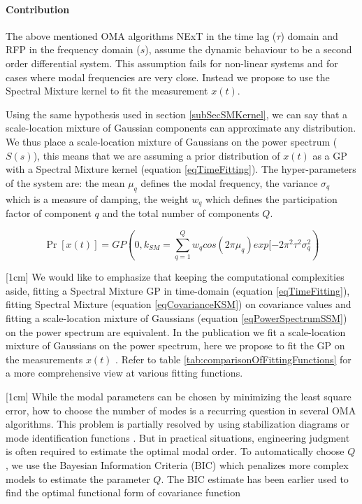 \begin{mdframed}[hidealllines=true,backgroundcolor=blue!20]
\paragraph{Contribution}
The above mentioned OMA algorithms NExT in the time lag ($ \tau$) domain and RFP in the frequency domain ($s$), assume the dynamic behaviour to be a second order differential system. This assumption fails for non-linear systems and for cases where modal frequencies are very close. Instead we propose to use the Spectral Mixture kernel to fit the measurement $x(t)$. 

Using the same hypothesis used in section \ref{subSecSMKernel}, we can say that a scale-location mixture of Gaussian components can approximate any distribution. We thus place a scale-location mixture of Gaussians on the power spectrum ($S(s)$), this means that we are assuming a prior distribution of $x(t)$ as a GP with a Spectral Mixture kernel (equation \ref{eqTimeFitting}). The hyper-parameters of the system are: the mean $\mu_{q}$ defines the modal frequency, the variance $\sigma_{q}$ which is a measure of damping, the weight $w_{q}$ which defines the participation factor of component $q$ and the total number of components $Q$.

\begin{equation}\label{eqTimeFitting}
\Pr[x(t)] = GP(0, k_{SM} = \sum_{q=1}^{Q}w_{q}cos(2\pi\mu_{q}) exp[-2\pi^{2}\tau^{2}\sigma_{q}^2)
\end{equation}

[1cm]
\sloppy We would like to emphasize that keeping the computational complexities aside, fitting a Spectral Mixture GP in time-domain (equation \ref{eqTimeFitting}), fitting Spectral Mixture (equation \ref{eqCovarianceKSM}) on covariance values and fitting a scale-location mixture of Gaussians (equation \ref{eqPowerSpectrumSSM}) on the power spectrum are equivalent. In the publication \cite{chiplunkar2017operational} we fit a scale-location mixture of Gaussians on the power spectrum, here we propose to fit the GP on the measurements $x(t)$ . Refer to table \ref{tab:comparisonOfFittingFunctions} for a more comprehensive view at various fitting functions.

[1cm]
While the modal parameters can be chosen by minimizing the least square error, how to choose the number of modes is a recurring question in several OMA algorithms. This problem is partially resolved by using stabilization diagrams or mode identification functions \cite{allemang1998unified, williams1985multivariate, shih1988complex}. But in practical situations, engineering judgment is often required to estimate the optimal modal order. To automatically choose $Q$, we use the Bayesian Information Criteria (BIC) \cite{findley1991counterexamples} which penalizes more complex models to estimate the parameter $Q$. The BIC estimate has been earlier used to find the optimal functional form of covariance function \cite{duvenaud2013structure}


\end{mdframed}
